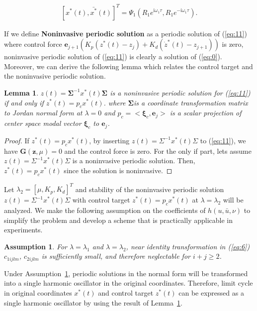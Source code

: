 \documentclass[openacc]{rsproca_new}%
\def\vec#1{\ensuremath{\mathbf{#1}}}
\newcommand{\Eref}[1]{(\ref{#1})}
\newcommand{\asref}[1]{Assumption~\ref{#1}}
\newcommand{\Lref}[1]{Lemma~\ref{#1}}
\newtheorem{lemma}{\bf Lemma}[section]
\newtheorem{assumption}{\bf Assumption}[section]
\begin{document}
\begin{align}\label{eq:16}
    [x^*(t),\bar {x^*}(t)]^T=\Psi_1(R_1e^{\textrm{i}\omega_1 \tau},R_1e^{-\textrm{i}\omega_1 \tau}).
\end{align}

\noindent If we define \textbf{Noninvasive periodic solution} as a periodic solution of \Eref{eq:11} where control force $\vec{e}_{j+1}(K_p(z^*(t)-z_j)+K_d(\dot z^*(t)-z_{j+1}))$ is zero, noninvasive periodic solution of \Eref{eq:11} is clearly a solution of \Eref{eq:0}. Moreover, we can derive the following lemma which relates the control target and the noninvasive periodic solution.

\begin{lemma}\label{l1}
$z(t)=\vec{\Sigma}^{-1}x^*(t)\vec{\Sigma}$ is a noninvasive periodic solution for \Eref{eq:11} if and only if $z^*(t)=p_c x^*(t)$.
where $\vec{\Sigma}$is a coordinate transformation matrix to Jordan normal form at $\lambda=0$ and $p_c=<\vec{\xi}_c,\vec{e}_{j}>$ is a scalar projection of center space modal vector $\vec{\xi}_c$ to $\vec{e}_{j}$.
\end{lemma}

\begin{proof}
If $z^*(t)=p_cx^*(t)$, by inserting $z(t)=\Sigma^{-1}x^*(t)\Sigma$ to \Eref{eq:11}, we have $\vec{G}(\vec{z},\mu)=0$ and the control force is zero. For the only if part, lets assume $z(t)=\Sigma^{-1}x^*(t)\Sigma$ is a noninvasive periodic solution. Then, $z^*(t)=p_cx^*(t)$ since the solution is noninvasive.
\end{proof}

\noindent Let $\lambda_2=[\mu,K_p,K_d]^T$ and stability of the noninvasive periodic solution $z(t)=\Sigma^{-1}x^*(t)\Sigma$ with control target $z^*(t)=p_cx^*(t)$  at $\lambda=\lambda_2$ will be analyzed. We make the following assumption on the coefficients of $h(u,\bar u,\nu)$ to simplify the problem and develop a scheme that is practically applicable in experiments.

\begin{assumption}\label{a1}
For $\lambda=\lambda_1$ and $\lambda=\lambda_2$, near identity transformation in \Eref{eq:6} $c_{1ijlm}$, $c_{2ijlm}$ is sufficiently small, and therefore neglectable for $i+j\geq 2$.
\end{assumption}

\noindent  Under \asref{a1}, periodic solutions in the normal form will be transformed into a single harmonic oscillator in the original coordinates. Therefore, limit cycle in original coordinates $x^*(t)$ and control target  $z^*(t)$ can be expressed as a single harmonic oscillator by using the result of \Lref{l1}.
\end{document}
